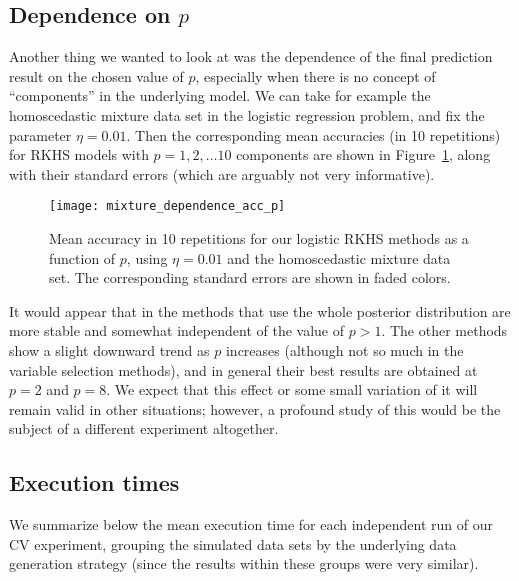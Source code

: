 \subsection*{Dependence on \(p\)}

Another thing we wanted to look at was the dependence of the final prediction result on the chosen value of \(p\), especially when there is no concept of ``components'' in the underlying model. We can take for example the homoscedastic mixture data set in the logistic regression problem, and fix the parameter \(\eta=0.01\). Then the corresponding mean accuracies (in 10 repetitions) for RKHS models with \(p=1,2,\dots 10\) components are shown in Figure~\ref{fig:dependence_acc_p}, along with their standard errors (which are arguably not very informative).

\begin{figure}[ht!]
  \centering
  \texttt{[image: mixture\_dependence\_acc\_p]}
  \caption{Mean accuracy in 10 repetitions for our logistic RKHS methods as a function of \(p\), using \(\eta=0.01\) and the homoscedastic mixture data set. The corresponding standard errors are shown in faded colors.}\label{fig:dependence_acc_p}
\end{figure}

It would appear that in the methods that use the whole posterior distribution are more stable and somewhat independent of the value of \(p>1\). The other methods show a slight downward trend as \(p\) increases (although not so much in the variable selection methods), and in general their best results are obtained at \(p=2\) and \(p=8\). We expect that this effect or some small variation of it will remain valid in other situations; however, a profound study of this would be the subject of a different experiment altogether.

\subsection*{Execution times}

We summarize below the mean execution time for each independent run of our CV experiment, grouping the simulated data sets by the underlying data generation strategy (since the results within these groups were very similar).

